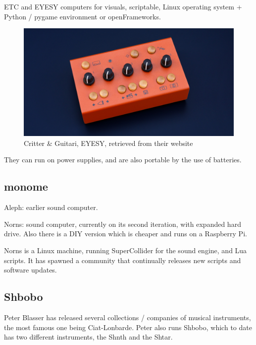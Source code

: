 ETC and EYESY computers for visuals, scriptable, Linux operating system + Python / pygame environment or openFrameworks.

\begin{figure}[h]
  \centering
  \includegraphics[width=0.75\linewidth,height=0.25\textheight,keepaspectratio]{images/critter-and-guitari-eyesy.jpg}
  \caption{Critter \& Guitari, EYESY, retrieved from their website}
  \label{fig:critter-and-guitari-eyesy}
\end{figure}

They can run on power supplies, and are also portable by the use of batteries.

\subsection{monome}

Aleph: earlier sound computer.

Norns: sound computer, currently on its second iteration, with expanded hard drive. Also there is a DIY version which is cheaper and runs on a Raspberry Pi.

Norns is a Linux machine, running SuperCollider for the sound engine, and Lua scripts. It has spawned a community that continually releases new scripts and software updates.

\subsection{Shbobo}

Peter Blasser has released several collections / companies of musical instruments, the most famous one being Ciat-Lonbarde. Peter also runs Shbobo, which to date has two different instruments, the Shnth and the Shtar.

